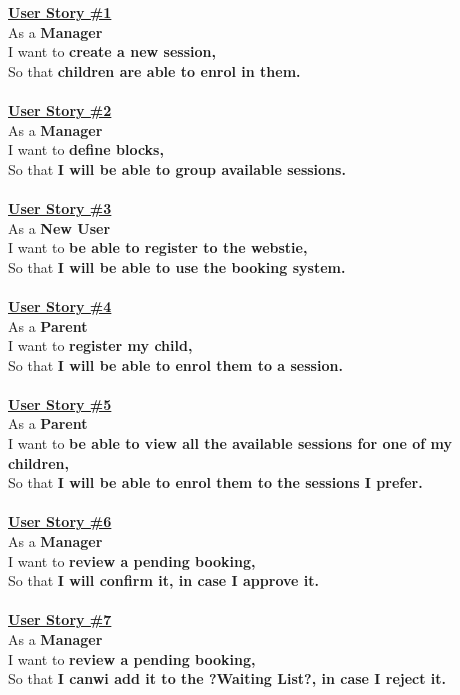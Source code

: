 \documentclass{l3proj}
\begin{document}
\textbf{\underline{User Story \#1}}\\
As a \textbf{Manager}\\
I want to \textbf{create a new session,}\\
So that \textbf{children are able to enrol in them.}\\
\\
\textbf{\underline{User Story \#2}}\\
As a \textbf{Manager}\\
I want to \textbf{define blocks,}\\
So that \textbf{I will be able to group available sessions.}\\
\\
\textbf{\underline{User Story \#3}}\\
As a \textbf{New User}\\
I want to \textbf{be able to register to the webstie,}\\
So that \textbf{I will be able to use the booking system.}\\
\\
\textbf{\underline{User Story \#4}}\\
As a \textbf{Parent}\\
I want to \textbf{register my child,}\\
So that \textbf{I will be able to enrol them to a session.}\\
\\
\textbf{\underline{User Story \#5}}\\
As a \textbf{Parent}\\
I want to \textbf{be able to view all the available sessions for one of my children,}\\
So that \textbf{I will be able to enrol them to the sessions I prefer.}\\
\\
\textbf{\underline{User Story \#6}}\\
As a \textbf{Manager}\\
I want to \textbf{review a pending booking,}\\
So that \textbf{I will confirm it, in case I approve it.}\\
\\
\textbf{\underline{User Story \#7}}\\
As a \textbf{Manager}\\
I want to \textbf{review a pending booking,}\\
So that \textbf{I canwi add it to the ?Waiting List?, in case I reject it.}\\
\end{document}

